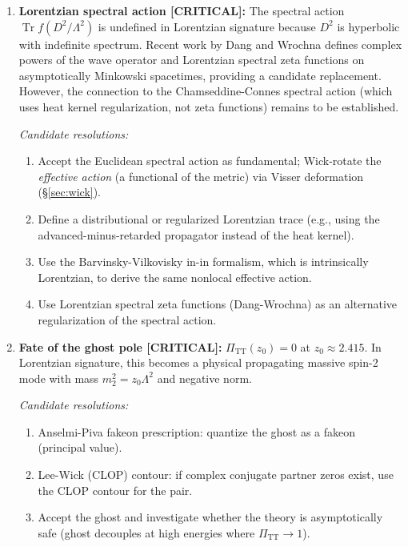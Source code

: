 \documentclass[12pt,a4paper]{article}
\theoremstyle{definition}
\theoremstyle{remark}
\newcommand{\Tr}{\operatorname{Tr}}
\begin{document}
\begin{enumerate}[label=\textbf{G\arabic*.}]

\item \textbf{Lorentzian spectral action [CRITICAL]:}
  \label{gap:lor-sa}
  The spectral action $\Tr f(D^2/\Lambda^2)$ is undefined in
  Lorentzian signature because $D^2$ is hyperbolic with indefinite
  spectrum.  Recent work by Dang and Wrochna
  \cite{DangWrochna2022,DangWrochna2022b} defines complex powers of
  the wave operator and Lorentzian spectral zeta functions on
  asymptotically Minkowski spacetimes, providing a candidate
  replacement.  However, the connection to the Chamseddine-Connes
  spectral action (which uses heat kernel regularization, not zeta
  functions) remains to be established.

  \emph{Candidate resolutions:}
  \begin{enumerate}[nosep,label=(\alph*)]
    \item Accept the Euclidean spectral action as fundamental; Wick-rotate
      the \emph{effective action} (a functional of the metric) via
      Visser deformation (\S\ref{sec:wick}).
    \item Define a distributional or regularized Lorentzian trace
      (e.g., using the advanced-minus-retarded propagator instead of
      the heat kernel).
    \item Use the Barvinsky-Vilkovisky in-in formalism, which is
      intrinsically Lorentzian, to derive the same nonlocal effective
      action.
    \item Use Lorentzian spectral zeta functions (Dang-Wrochna)
      as an alternative regularization of the spectral action.
  \end{enumerate}

\item \textbf{Fate of the ghost pole [CRITICAL]:}
  \label{gap:ghost}
  $\Pi_{\mathrm{TT}}(z_0) = 0$ at $z_0 \approx 2.415$.  In
  Lorentzian signature, this becomes a physical propagating massive
  spin-2 mode with mass $m_2^2 = z_0\Lambda^2$ and negative norm.

  \emph{Candidate resolutions:}
  \begin{enumerate}[nosep,label=(\alph*)]
    \item Anselmi-Piva fakeon prescription: quantize the ghost as
      a fakeon (principal value).
    \item Lee-Wick (CLOP) contour: if complex conjugate partner
      zeros exist, use the CLOP contour for the pair.
    \item Accept the ghost and investigate whether the theory is
      asymptotically safe (ghost decouples at high energies where
      $\Pi_{\mathrm{TT}} \to 1$).
  \end{enumerate}


\end{enumerate}
\end{document}
